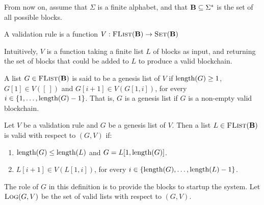 From now on, assume that $\Sigma$ is a finite alphabet, and that $\text{\bf B} \subseteq \Sigma^*$ is the set of all possible blocks.  

\begin{mydef}
	A validation rule is a function $V : \text{\sc FList}(\text{\bf B}) \to \text{\sc Set}(\text{\bf B})$
\end{mydef}
Intuitively, $V$ is a function taking a finite list $L$ of blocks as input, and returning the set of blocks that could be added to $L$ to produce a valid blockchain.

A list $G \in \text{\sc FList}(\text{\bf B})$  is said to be a genesis list of $V$ if $\text{\rm length}(G) \geq 1$, $G[1] \in V([\ ])$ and $G[i+1] \in V(G[1,i])$, for every $i \in \{1, \ldots, \text{\rm length}(G)-1\}$. That is, $G$ is a genesis list if $G$ is a non-empty valid blockchain. 
\begin{mydef}
	Let $V$ be a validation rule and $G$ be a genesis list of $V$. Then a list $L \in \text{\sc FList}(\text{\bf B})$ is valid with respect to $(G,V)$ if:
	\begin{enumerate}
		\item $\text{\rm length}(G) \leq \text{\rm length}(L)$ and $G = L[1,\text{\rm length}(G)]$.
		
		\item $L[i+1] \in V(L[1,i])$, for every $i \in \{\text{\rm length}(G), \ldots, \text{\rm length}(L)-1\}$.
	\end{enumerate}
\end{mydef}
The role of $G$ in this definition is to provide the blocks to startup the system. Let $\text{\sc Log}(G,V)$ be the set of valid lists with respect to $(G,V)$.

%
%

